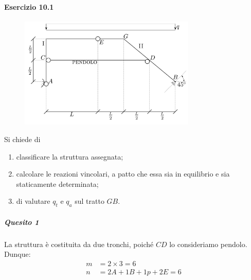 \paragraph{Esercizio 10.1}
\renewcommand{\thefigure}{10.1~-~1}
\begin{figure}[ht]
\centering
\includegraphics[width=0.75\textwidth]{Immagini/Parte_10/Esercizio10_1_1/Esercizio10_1_1.pdf}
\caption{}
\label{Esercizio10-1-1}
\end{figure}
Si chiede di
\begin{enumerate}
\item classificare la struttura assegnata; 
\item calcolare le reazioni vincolari, a patto che essa sia in equilibrio e sia staticamente determinata; 
\item di valutare $q_{t}$ e $q_{a}$ sul tratto $GB$.
\end{enumerate}
\subparagraph{Quesito 1}
La struttura è costituita da due tronchi, poiché $CD$ lo consideriamo pendolo. Dunque:
\begin{align*}
m &= 2\times 3 = 6 \\ 
n &= 2A + 1B + 1p + 2E = 6
\end{align*}
